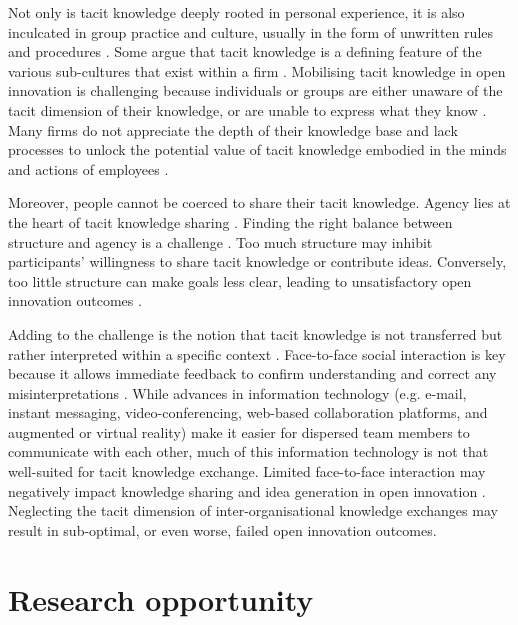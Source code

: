 Not only is tacit knowledge deeply rooted in personal experience, it is also inculcated in group practice and culture, usually in the form of unwritten rules and procedures \citep{nonaka1995knowledge}. Some argue that tacit knowledge is a defining feature of the various sub-cultures that exist within a firm \citep[e.g.][]{munoz2015tacit}. Mobilising tacit knowledge in open innovation is challenging because individuals or groups are either unaware of the tacit dimension of their knowledge, or are unable to express what they know \citep{polanyi1966tacit}. Many firms do not appreciate the depth of their knowledge base and lack processes to unlock the potential value of tacit knowledge embodied in the minds and actions of employees \citep{nonaka1994dynamic,horvath2000working}. \medskip

Moreover, people cannot be coerced to share their tacit knowledge. Agency lies at the heart of tacit knowledge sharing \citep{polyani1966, emirbayer1994network}. Finding the right balance between structure and agency is a challenge \citep{davis2010agency}. Too much structure may inhibit participants' willingness to share tacit knowledge or contribute ideas. Conversely, too little structure can make goals less clear, leading to unsatisfactory open innovation outcomes \citep{lam2000tacit}.  \medskip

Adding to the challenge is the notion that tacit knowledge is not transferred but rather interpreted within a specific context \citep{nonaka1995knowledge,duguid2005art,marabelli2014knowing,zhang2020extended}. Face-to-face social interaction is key because it allows immediate feedback to confirm understanding and correct any misinterpretations \citep{haldin2000difficulties,gertler2003tacit,koskinen2003tacit}. While advances in information technology (e.g. e-mail, instant messaging, video-conferencing, web-based collaboration platforms, and augmented or virtual reality) make it easier for dispersed team members to communicate with each other, much of this information technology is not that well-suited for tacit knowledge exchange. Limited face-to-face interaction may negatively impact knowledge sharing and idea generation in open innovation \citep{johannessen2001mismanagement}. Neglecting the tacit dimension of inter-organisational knowledge exchanges may result in sub-optimal, or even worse, failed open innovation outcomes. 

\section{Research opportunity}

